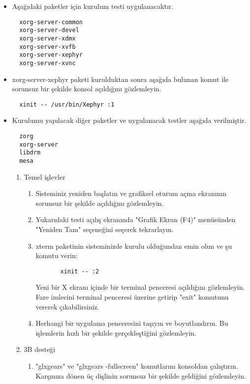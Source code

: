 \documentclass[a4paper,10pt]{article}
\begin{document}
\begin{itemize}
  \item Aşağıdaki paketler için kurulum testi uygulanacaktır.
  \begin{verbatim}
  xorg-server-common
  xorg-server-devel
  xorg-server-xdmx
  xorg-server-xvfb
  xorg-server-xephyr
  xorg-server-xvnc
  \end{verbatim}

  \item xorg-server-xephyr paketi kurulduktan sonra aşağıda bulunan komut ile sorunsuz bir şekilde konsol
  açıldığını gözlemleyin.
  \begin{verbatim}
  xinit -- /usr/bin/Xephyr :1
  \end{verbatim}

  \item Kurulumu yapılacak diğer paketler ve uygulanacak testler aşağıda verilmiştir.
  \begin{verbatim}
  zorg    
  xorg-server
  libdrm
  mesa
  \end{verbatim}


  \begin{enumerate}
  \item Temel işlevler
    \begin{enumerate}
    \item Sisteminiz yeniden başlatın ve grafiksel oturum açma ekranının sorunsuz bir şekilde açıldığını gözlemleyin.
    \item Yukarıdaki testi açılış ekranında "Grafik Ekran (F4)" menüsünden "Yeniden Tanı" seçeneğini seçerek tekrarlayın.
    \item xterm paketinin sisteminizde kurulu olduğundan emin olun ve şu komutu verin:
      \begin{verbatim}
       xinit -- :2
      \end{verbatim}
      Yeni bir X ekranı içinde bir terminal penceresi açıldığını gözlemleyin. Fare imlecini terminal penceresi üzerine getirip "exit" komutunu vererek çıkabilirsiniz.
    \item Herhangi bir uygulama penceresini taşıyın ve boyutlandırın. Bu işlemlerin hızlı bir şekilde gerçekleştiğini gözlemleyin.
    \end{enumerate}

  \item 3B desteği
    \begin{enumerate}
    \item "glxgears" ve "glxgears -fullscreen" komutlarını konsoldan çalıştırın. Karşınıza dönen üç dişlinin sorunsuz bir şekilde geldiğini gözlemleyin.
    \end{enumerate}


\end{enumerate}
\end{itemize}
\end{document}

